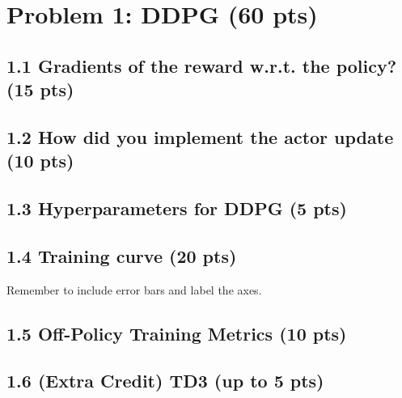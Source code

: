 \documentclass[12pt]{article}
\begin{document}
\newpage
\section*{Problem 1: DDPG (60 pts)}

\subsection*{1.1 Gradients of the reward w.r.t. the policy? (15 pts)}
\begin{solution}[height=5cm]
\end{solution}

\subsection*{1.2 How did you implement the actor update (10 pts)}
\begin{solution}[height=5cm]
\end{solution}

\subsection*{1.3 Hyperparameters for DDPG (5 pts)}
\begin{solution}[height=5cm]
\end{solution}

\subsection*{1.4 Training curve (20 pts)}
Remember to include error bars and label the axes.
\begin{solution}[height=20cm]
\end{solution}

\subsection*{1.5 Off-Policy Training Metrics (10 pts)}
\begin{solution}[height=20cm]
\end{solution}

\subsection*{1.6 (Extra Credit) TD3 (up to 5 pts)}
\begin{solution}[height=20cm]
\end{solution}
\end{document}
